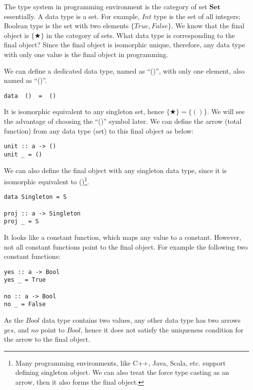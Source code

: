 \documentclass{article}
\begin{document}
\begin{example}
\normalfont

The type system in programming environment is the category of set $\pmb{Set}$ essentially. A data type is a set. For example, $Int$ type is the set of all integers; Boolean type is the set with two elements $\{True, False\}$. We know that the final object is $\{ \bigstar \}$ in the category of sets. What data type is corresponding to the final object? Since the final object is isomorphic unique, therefore, any data type with only one value is the final object in programming.

We can define a dedicated data type, named as ``()'', with only one element, also named as ``()''.

\begin{lstlisting}
data  ()  =  ()
\end{lstlisting}

It is isomorphic equivalent to any singleton set, hence $\{ \bigstar \} = \{()\}$. We will see the advantage of choosing the ``()'' symbol later. We can define the arrow (total function) from any data type (set) to this final object as below:

\begin{lstlisting}
unit :: a -> ()
unit _ = ()
\end{lstlisting}

We can also define the final object with any singleton data type, since it is isomorphic equivalent to ()\footnote{Many programming environments, like C++, Java, Scala, etc. support defining singleton object. We can also treat the force type casting as an arrow, then it also forms the final object.}.

\begin{lstlisting}
data Singleton = S

proj :: a -> Singleton
proj _ = S
\end{lstlisting}

It looks like a constant function, which maps any value to a constant. However, not all constant functions point to the final object. For example the following two constant functions:

\begin{lstlisting}
yes :: a -> Bool
yes _ = True

no :: a -> Bool
no _ = False
\end{lstlisting}

As the $Bool$ data type contains two values, any other data type has two arrows $yes$, and $no$ point to $Bool$, hence it does not satisfy the uniqueness condition for the arrow to the final object.


\end{example}
\end{document}
